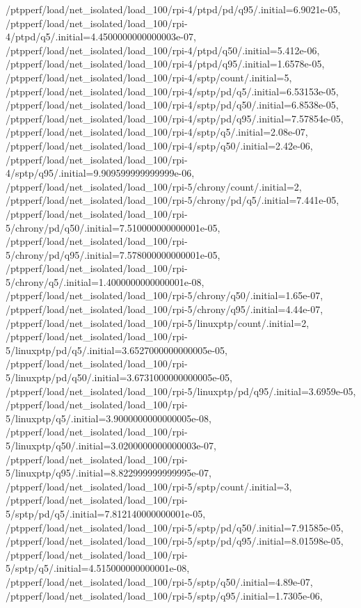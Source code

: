 {    /ptpperf/load/net_isolated/load_100/rpi-4/ptpd/pd/q95/.initial=6.9021e-05,
    /ptpperf/load/net_isolated/load_100/rpi-4/ptpd/q5/.initial=4.4500000000000003e-07,
    /ptpperf/load/net_isolated/load_100/rpi-4/ptpd/q50/.initial=5.412e-06,
    /ptpperf/load/net_isolated/load_100/rpi-4/ptpd/q95/.initial=1.6578e-05,
    /ptpperf/load/net_isolated/load_100/rpi-4/sptp/count/.initial=5,
    /ptpperf/load/net_isolated/load_100/rpi-4/sptp/pd/q5/.initial=6.53153e-05,
    /ptpperf/load/net_isolated/load_100/rpi-4/sptp/pd/q50/.initial=6.8538e-05,
    /ptpperf/load/net_isolated/load_100/rpi-4/sptp/pd/q95/.initial=7.57854e-05,
    /ptpperf/load/net_isolated/load_100/rpi-4/sptp/q5/.initial=2.08e-07,
    /ptpperf/load/net_isolated/load_100/rpi-4/sptp/q50/.initial=2.42e-06,
    /ptpperf/load/net_isolated/load_100/rpi-4/sptp/q95/.initial=9.909599999999999e-06,
    /ptpperf/load/net_isolated/load_100/rpi-5/chrony/count/.initial=2,
    /ptpperf/load/net_isolated/load_100/rpi-5/chrony/pd/q5/.initial=7.441e-05,
    /ptpperf/load/net_isolated/load_100/rpi-5/chrony/pd/q50/.initial=7.510000000000001e-05,
    /ptpperf/load/net_isolated/load_100/rpi-5/chrony/pd/q95/.initial=7.578000000000001e-05,
    /ptpperf/load/net_isolated/load_100/rpi-5/chrony/q5/.initial=1.4000000000000001e-08,
    /ptpperf/load/net_isolated/load_100/rpi-5/chrony/q50/.initial=1.65e-07,
    /ptpperf/load/net_isolated/load_100/rpi-5/chrony/q95/.initial=4.44e-07,
    /ptpperf/load/net_isolated/load_100/rpi-5/linuxptp/count/.initial=2,
    /ptpperf/load/net_isolated/load_100/rpi-5/linuxptp/pd/q5/.initial=3.6527000000000005e-05,
    /ptpperf/load/net_isolated/load_100/rpi-5/linuxptp/pd/q50/.initial=3.6731000000000005e-05,
    /ptpperf/load/net_isolated/load_100/rpi-5/linuxptp/pd/q95/.initial=3.6959e-05,
    /ptpperf/load/net_isolated/load_100/rpi-5/linuxptp/q5/.initial=3.9000000000000005e-08,
    /ptpperf/load/net_isolated/load_100/rpi-5/linuxptp/q50/.initial=3.0200000000000003e-07,
    /ptpperf/load/net_isolated/load_100/rpi-5/linuxptp/q95/.initial=8.822999999999995e-07,
    /ptpperf/load/net_isolated/load_100/rpi-5/sptp/count/.initial=3,
    /ptpperf/load/net_isolated/load_100/rpi-5/sptp/pd/q5/.initial=7.812140000000001e-05,
    /ptpperf/load/net_isolated/load_100/rpi-5/sptp/pd/q50/.initial=7.91585e-05,
    /ptpperf/load/net_isolated/load_100/rpi-5/sptp/pd/q95/.initial=8.01598e-05,
    /ptpperf/load/net_isolated/load_100/rpi-5/sptp/q5/.initial=4.515000000000001e-08,
    /ptpperf/load/net_isolated/load_100/rpi-5/sptp/q50/.initial=4.89e-07,
    /ptpperf/load/net_isolated/load_100/rpi-5/sptp/q95/.initial=1.7305e-06,
}
